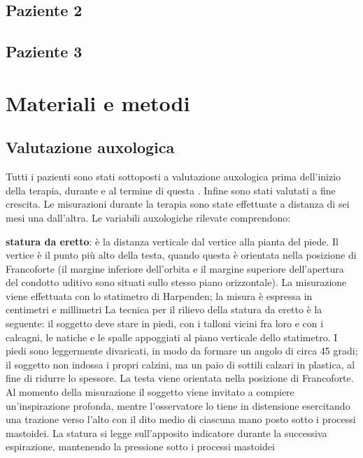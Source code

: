 \subsection*{Paziente 2}

\clearpage

\subsection*{Paziente 3}

\clearpage

\section{Materiali e metodi}

\subsection{Valutazione auxologica}
Tutti i pazienti sono stati sottoposti a valutazione auxologica prima dell'inizio della terapia, durante e al termine di questa . Infine sono stati valutati a fine crescita. Le misurazioni durante la terapia sono state effettuate a distanza di sei mesi una dall'altra.
Le variabili auxologiche rilevate comprendono:


\textbf{statura da eretto}: è la distanza verticale dal vertice alla pianta del piede. Il vertice è il punto più alto della testa, quando questa è orientata nella posizione di Francoforte (il margine inferiore dell'orbita e il margine superiore dell'apertura del condotto uditivo sono situati sullo stesso piano orizzontale). La misurazione viene effettuata con lo statimetro di Harpenden; la misura è espressa in centimetri e millimetri%
La tecnica per il rilievo della statura da eretto è la seguente: il soggetto deve stare in piedi, con i talloni vicini fra loro e con i calcagni, le natiche e le spalle appoggiati al piano verticale dello statimetro. I piedi sono leggermente divaricati, in modo da formare un angolo di circa 45 gradi; il soggetto non indossa i propri calzini, ma un paio di sottili calzari in plastica, al fine di ridurre lo spessore. La testa viene orientata nella posizione di Francoforte. Al momento della misurazione il soggetto viene invitato a compiere un'inspirazione profonda, mentre l'osservatore lo tiene in distensione esercitando una trazione verso l'alto con il dito medio di ciascuna mano posto sotto i processi mastoidei. La statura si legge sull'apposito indicatore durante la successiva espirazione, mantenendo la pressione sotto i processi mastoidei%


